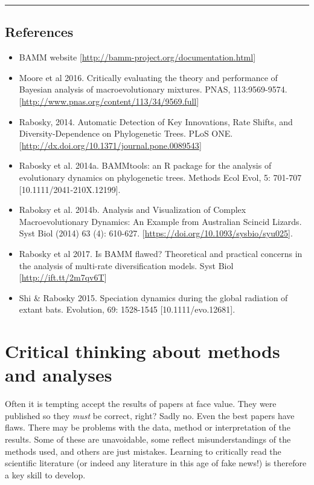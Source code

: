 \documentclass[]{book}
\providecommand{\tightlist}{%
  \setlength{\itemsep}{0pt}\setlength{\parskip}{0pt}}
\begin{document}
\begin{center}\rule{0.5\linewidth}{\linethickness}\end{center}

\section{References}\label{references-5}

\begin{itemize}
\tightlist
\item
  BAMM website {[}\url{http://bamm-project.org/documentation.html}{]}
\item
  Moore et al 2016. Critically evaluating the theory and performance of
  Bayesian analysis of macroevolutionary mixtures. PNAS, 113:9569-9574.
  {[}\url{http://www.pnas.org/content/113/34/9569.full}{]}
\item
  Rabosky, 2014. Automatic Detection of Key Innovations, Rate Shifts,
  and Diversity-Dependence on Phylogenetic Trees. PLoS ONE.
  {[}\url{http://dx.doi.org/10.1371/journal.pone.0089543}{]}
\item
  Rabosky et al. 2014a. BAMMtools: an R package for the analysis of
  evolutionary dynamics on phylogenetic trees. Methods Ecol Evol, 5:
  701-707 {[}10.1111/2041-210X.12199{]}.
\item
  Raboksy et al. 2014b. Analysis and Visualization of Complex
  Macroevolutionary Dynamics: An Example from Australian Scincid
  Lizards. Syst Biol (2014) 63 (4): 610-627.
  {[}\url{https://doi.org/10.1093/sysbio/syu025}{]}.
\item
  Rabosky et al 2017. Is BAMM flawed? Theoretical and practical concerns
  in the analysis of multi-rate diversification models. Syst Biol
  {[}\url{http://ift.tt/2m7qv6T}{]}
\item
  Shi \& Rabosky 2015. Speciation dynamics during the global radiation
  of extant bats. Evolution, 69: 1528-1545 {[}10.1111/evo.12681{]}.
\end{itemize}

\chapter{Critical thinking about methods and
analyses}\label{critical-thinking-about-methods-and-analyses}

Often it is tempting accept the results of papers at face value. They
were published so they \emph{must} be correct, right? Sadly no. Even the
best papers have flaws. There may be problems with the data, method or
interpretation of the results. Some of these are unavoidable, some
reflect misunderstandings of the methods used, and others are just
mistakes. Learning to critically read the scientific literature (or
indeed any literature in this age of fake news!) is therefore a key
skill to develop.
\end{document}
